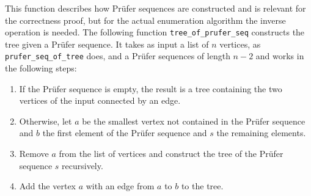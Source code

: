 This function describes how Prüfer sequences are constructed and is relevant for the correctness proof, but for the actual enumeration algorithm the inverse operation is needed.
The following function \texttt{tree\_of\_prufer\_seq} constructs the tree given a Prüfer sequence.
It takes as input a list of $n$ vertices, as \texttt{prufer\_seq\_of\_tree} does, and a Prüfer sequences of length $n - 2$ and works in the following steps:

\begin{enumerate}
    \item If the Prüfer sequence is empty, the result is a tree containing the two vertices of the input connected by an edge.
    \item Otherwise, let $a$ be the smallest vertex not contained in the Prüfer sequence and $b$ the first element of the Prüfer sequence and $s$ the remaining elements.
    \item Remove $a$ from the list of vertices and construct the tree of the Prüfer sequence $s$ recursively.
    \item Add the vertex $a$ with an edge from $a$ to $b$ to the tree.
\end{enumerate}

